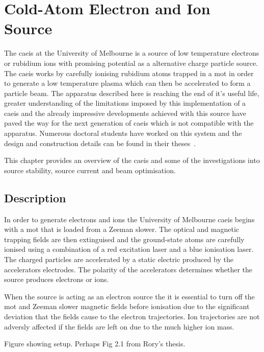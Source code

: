 \chapter{Cold-Atom Electron and Ion Source}\label{chapter:setup}

The \gls{caeis} at the University of Melbourne is a source of low temperature electrons or rubidium ions with promising potential as a alternative charge particle source.
The \gls{caeis} works by carefully ionising rubidium atoms trapped in a \gls{mot} in order to generate a low temperature plasma which can then be accelerated to form a particle beam.
The apparatus described here is reaching the end of it's useful life, greater understanding of the limitations imposed by this implementation of a \gls{caeis} and the already impressive developments achieved with this source have paved the way for the next generation of \gls{caeis} which is not compatible with the apparatus.
Numerous doctoral students have worked on this system and the design and construction details can be found in their theses~\cite{sheludko_shaped_2010,bell_cold_2011,saliba_cold_2011,mcculloch_generation_2013,murphy_measurement_2017,spiers_electron_2017}.

This chapter provides an overview of the \gls{caeis} and some of the investigations into source stability, source current and beam optimisation.

\section{Description}
In order to generate electrons and ions the University of Melbourne \gls{caeis} begins with a \gls{mot} that is loaded from a Zeeman slower.
The optical and magnetic trapping fields are then extinguised and the ground-state atoms are carefully ionised using a combination of a red excitation laser and a blue ionisation laser.
The charged particles are accelerated by a static electric produced by the accelerators electrodes.
The polarity of the accelerators determines whether the source produces electrons or ions.

When the source is acting as an electron source the it is essential to turn off the \gls{mot} and Zeeman slower magnetic fields before ionisation due to the significant deviation that the fields cause to the electron trajectories.
Ion trajectories are not adversly affected if the fields are left on due to the much higher ion mass.

{\color{red}Figure showing setup. Perhaps Fig 2.1 from Rory's thesis.}

